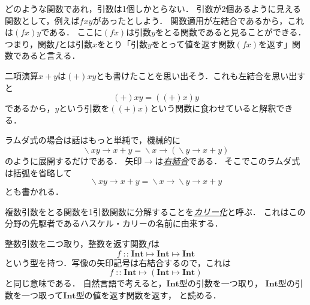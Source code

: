 \documentclass[a5paper,draft]{jsbook}
\newcommand{\keyword}[1]{{\underline{\emph{#1}}}}
\newcommand{\mathTypeName}[1]{\textbf{#1}}
\newcommand{\mathUnaryOperator}[1]{\operatorname{#1}}
\newcommand{\mathLambda}{\mathUnaryOperator{\backslash}}
\newcommand{\mathBinaryOperator}[1]{\operatorname{#1}}
\newcommand{\mathIn}{\mathBinaryOperator{:\!:}}
\newcommand{\mathLambdaArrow}{\rightarrow}
\newcommand{\mathMapsTo}{\mapsto}
\newcommand{\mathLambdaExpression}[2]{\mathLambda#1\mathLambdaArrow#2}
\newcommand{\mathMorphII}[3]{#1\mathMapsTo#2\mathMapsTo#3}
\newcommand{\mathMorphIIWithParenthesis}[3]{#1\mathMapsTo(#2\mathMapsTo#3)}
\begin{document}
どのような関数であれ，引数は1個しかとらない．
引数が2個あるように見える関数として，例えば$fxy$があったとしよう．
関数適用が左結合であるから，これは$\left(fx\right)y$である．
ここに$\left(fx\right)$は引数$y$をとる関数であると見ることができる．
つまり，関数$f$とは引数$x$をとり「引数$y$をとって値を返す関数$\left(fx\right)$を返す」関数であると言える．

二項演算$x+y$は$(+)xy$とも書けたことを思い出そう．これも左結合を思い出すと
\begin{equation}
(+)xy=\left((+)x\right)y
\end{equation}
であるから，$y$という引数を$\left((+)x\right)$という関数に食わせていると解釈できる．

ラムダ式の場合は話はもっと単純で，機械的に
\begin{equation}
\mathLambdaExpression{xy}{x+y}
=\mathLambdaExpression{x}{\left(\mathLambdaExpression{y}{x+y}\right)}
\end{equation}
のように展開するだけである．
矢印$\mathLambdaArrow$は\keyword{右結合}である．
そこでこのラムダ式は括弧を省略して
\begin{equation}
\mathLambdaExpression{xy}{x+y}=\mathLambdaExpression{x}{\mathLambdaExpression{y}{x+y}}
\end{equation}
とも書かれる．

複数引数をとる関数を1引数関数に分解することを\keyword{カリー化}と呼ぶ．
これはこの分野の先駆者であるハスケル・カリーの名前に由来する．


整数引数を二つ取り，整数を返す関数$f$は
\begin{equation}
f\mathIn\mathMorphII{\mathTypeName{Int}}{\mathTypeName{Int}}{\mathTypeName{Int}}
\end{equation}
という型を持つ．写像の矢印記号は右結合するので，これは
\begin{equation}
f\mathIn\mathMorphIIWithParenthesis{\mathTypeName{Int}}{\mathTypeName{Int}}{\mathTypeName{Int}}
\end{equation}
と同じ意味である．
自然言語で考えると，$\mathTypeName{Int}$型の引数を一つ取り，
$\mathTypeName{Int}$型の引数を一つ取って$\mathTypeName{Int}$型の値を返す関数を返す，
と読める．
\end{document}

